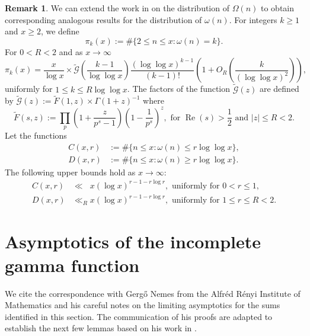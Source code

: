 \documentclass[11pt,reqno,a4letter]{article}
\numberwithin{equation}{section}
\numberwithin{figure}{section}
\numberwithin{table}{section}
\theoremstyle{plain}
\numberwithin{theorem}{section}
\theoremstyle{definition}
\newtheorem{remark}[theorem]{Remark}
\renewcommand{\Re}{\operatorname{Re}}
\begin{document}
\begin{remark} 
\label{remark_MV_Pikx_FuncResultsAnnotated_v1} 
We can extend the work in \cite{MV} on the distribution of $\Omega(n)$ to obtain 
corresponding analogous results for the distribution of $\omega(n)$. 
For integers $k  \geq 1$ and $x \geq 2$, we define 
\[
\pi_k(x) := \#\{2 \leq n \leq x: \omega(n)=k\}.
\]
For $0 < R < 2$ and as $x \rightarrow \infty$ 
\begin{equation}
\label{eqn_Pikx_UniformAsymptoticsStmt_from_MV_v2} 
\pi_k(x) = \frac{x}{\log x} \times 
     \widetilde{\mathcal{G}}\left(\frac{k-1}{\log\log x}\right) 
     \frac{(\log\log x)^{k-1}}{(k-1)!} \left( 
     1 + O_R\left(\frac{k}{(\log\log x)^2}\right) 
     \right), 
\end{equation}
uniformly for $1 \leq k \leq R\log\log x$. 
The factors of the function $\widetilde{\mathcal{G}}(z)$ are 
defined by $\widetilde{\mathcal{G}}(z) := \widetilde{F}(1, z) \times \Gamma(1+z)^{-1}$ where 
\[
\widetilde{F}(s, z) := \prod_p \left(1 + \frac{z}{p^s-1}\right) \left(1 - \frac{1}{p^s}\right)^{z}, 
	\text{ for } \Re(s) > \frac{1}{2} \text{ and } |z| \leq R < 2. 
\]
Let the functions 
\begin{align*} 
C(x, r) & := \#\{n \leq x: \omega(n) \leq r \log\log x\}, \\ 
D(x, r) & := \#\{n \leq x: \omega(n) \geq r \log\log x\}. 
\end{align*} 
The following upper bounds hold as $x \rightarrow \infty$: 
\begin{align*} 
C(x, r) & \ll\phantom{_R} x (\log x)^{r - 1 - r \log r}, \text{ uniformly for } 0 < r \leq 1, \\ 
D(x, r) & \ll_R x (\log x)^{r - 1 - r \log r}, \text{ uniformly for } 1 \leq r \leq R < 2.
\end{align*} 
\end{remark} 

\section{Asymptotics of the incomplete gamma function} 
\label{subSection_OtherFactsAndResults} 

We cite the correspondence with Gerg\H{o} Nemes 
from the Alfr\'{e}d R\'{e}nyi Institute of Mathematics and his 
careful notes on the limiting asymptotics for the sums identified in this section. 
The communication of his proofs are adapted to establish the next few lemmas based on 
his work in \cite{NEMES2015C,NEMES2016,NEMES2019}. 
\end{document}

